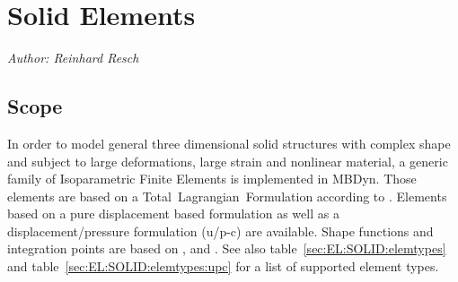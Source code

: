 %
%
%
%
%
%
%
%

\section{Solid Elements}
\label{sec:EL:SOLID}
\emph{Author: Reinhard Resch}
\subsection{Scope}
In order to model general three dimensional solid structures with complex shape and subject to large deformations,
large strain and nonlinear material, a generic family of Isoparametric Finite Elements is implemented in MBDyn.
Those elements are based on a Total~Lagrangian~Formulation according to \cite{BATHE2016}.
Elements based on a pure displacement based formulation as well as a displacement/pressure formulation (u/p-c) are available.
Shape functions and integration points are based on \cite{BATHE2016}, \cite{DHONDT2004} and \cite{CODEASTERR30301}.
See also table~\ref{sec:EL:SOLID:elemtypes} and table~\ref{sec:EL:SOLID:elemtypes:upc} for a list of supported element types.
